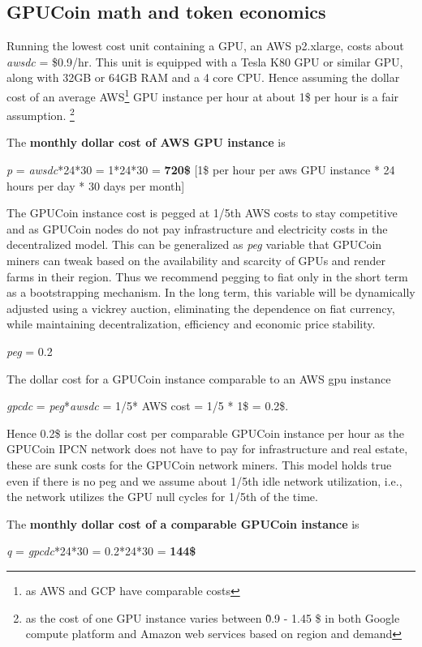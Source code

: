 \subsection{GPUCoin math and token economics}
Running the lowest cost unit containing a GPU, an AWS p2.xlarge, costs about \emph{awsdc} = \$0.9/hr. This unit is equipped with a Tesla K80 GPU or similar GPU, along with 32GB or 64GB RAM and a 4 core CPU. 
Hence assuming the dollar cost of an average AWS\footnote{as AWS and GCP have comparable costs} GPU instance per hour at about 1\$ per hour is a fair assumption. \footnote{ as the cost of one GPU instance varies between \~ 0.9 - 1.45 \$ in both Google compute platform and Amazon web services based on region and demand}

The \textbf{monthly dollar cost of AWS GPU instance} is

\emph{p} = \emph{awsdc}*24*30 = 1*24*30 = \textbf{720\$  } [1\$ per hour per aws GPU instance * 24 hours per day * 30 days per month]

The GPUCoin instance cost is pegged at 1/5th AWS costs to stay competitive
 and as GPUCoin nodes do not pay infrastructure and electricity costs in the decentralized model.
  This can be generalized as \emph{peg} variable that GPUCoin miners can tweak based on the availability and scarcity of GPUs and render farms in their region. Thus we recommend pegging to fiat only in the short term as a bootstrapping mechanism. In the long term, this variable will be dynamically adjusted using a vickrey auction, eliminating the dependence on fiat currency, while maintaining decentralization, efficiency and economic price stability. 

\emph{peg} = 0.2

The dollar cost for a GPUCoin instance comparable to an AWS gpu instance 

\emph{gpcdc} = \emph{peg}*\emph{awsdc} =  1/5* AWS cost = 1/5 * 1\$ = 0.2\$.

Hence 0.2\$ is the dollar cost per comparable GPUCoin instance per hour as the GPUCoin IPCN network does not have to pay for infrastructure and real estate, these are sunk costs for the GPUCoin network miners. This model holds true even if there is no peg and we assume about 1/5th idle network utilization, i.e., the network utilizes the GPU null cycles for 1/5th of the time.

The \textbf{monthly dollar cost of a comparable GPUCoin instance} is 

\emph{q} = \emph{gpcdc}*24*30 = 0.2*24*30 = \textbf{144\$ }

